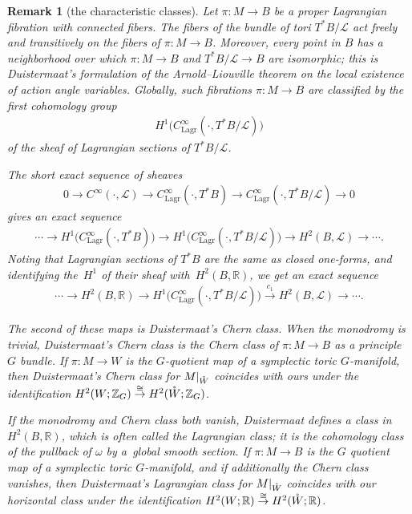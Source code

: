 \documentclass[pdftex]{sigma}
\numberwithin{equation}{section}
\newtheorem{Remark}[Lemma]{Remark}
\begin{document}
\begin{Remark}[the characteristic classes] \label{rmrk:1.9}
Let $\pi \colon M \to B$ be a proper Lagrangian f\/ibration with connected f\/ibers.
The f\/ibers of the bundle of tori $T^*B/{\mathcal L}$ act freely and transitively
on the f\/ibers of $\pi \colon M \to B$.
Moreover, every point in $B$ has a neighborhood over which
$\pi \colon M \to B$ and $T^*B/{\mathcal L} \to B$ are isomorphic;
this is Duistermaat's formulation of the Arnold--Liouville theorem
on the local existence of action angle variables.
Globally, such f\/ibrations $\pi \colon M \to B$
are classif\/ied by the f\/irst cohomology group
\begin{gather*}
 H^1 \big( C^{\infty}_{\text{Lagr}} (\cdot,T^*B/{\mathcal L}) \big)
 \end{gather*}
of the sheaf of Lagrangian sections of $T^*B/{\mathcal L}$.

The short exact sequence of sheaves
\begin{gather*}
 0 \to C^{\infty}(\cdot,{\mathcal L}) \to C^{\infty}_{\text{Lagr}} (\cdot,T^*B)
  \to C^{\infty}_{\text{Lagr}}(\cdot,T^*B/{\mathcal L}) \to 0
\end{gather*}
gives an exact sequence
\begin{gather*}
 \cdots \to
   H^1\big(C^{\infty}_{\text{Lagr}}(\cdot,T^*B)\big) \to H^1\big(C^{\infty}_{\text{Lagr}}(\cdot,T^*B/{\mathcal L})\big)
   \to H^2(B,{\mathcal L}) \to \cdots .
\end{gather*}
Noting that Lagrangian sections of $T^*B$ are the same as closed one-forms,
and identifying the~$H^1$ of their sheaf with~$H^2(B,{\mathbb R})$,
we get an exact sequence
\begin{gather} \label{exact Duis}
 \cdots \to
 H^2(B,{\mathbb R}) \to H^1\big(C^{\infty}_{\text{Lagr}}(\cdot,T^*B/{\mathcal L})\big) \stackrel{c_1}{\to}
 H^2(B,{\mathcal L})
 \to \cdots.
\end{gather}

The second of these maps is Duistermaat's Chern class.  When the monodromy
is trivial, Duistermaat's Chern class is the Chern class
of $\pi \colon M \to B$ as a principle $G$ bundle.
If $\pi \colon M \to W$ is the $G$-quotient map of a symplectic toric
$G$-manifold, then Duistermaat's Chern class for $M|_{{\mathaccent23{W}}}$
coincides with ours under the identif\/ication
$H^2(W;{\mathbb Z}_G) \stackrel{\cong}{\to} H^2({\mathaccent23{W}};{\mathbb Z}_G)$.

If the monodromy and Chern class both vanish, Duistermaat def\/ines a class
in $H^2(B,{\mathbb R})$, which is often called the \textit{Lagrangian class};
it is the cohomology class of the pullback of $\omega$ by a~global smooth
section.  If $\pi \colon M \to B$ is the $G$ quotient map of a symplectic toric
$G$-manifold, and if additionally the Chern class vanishes,
then Duistermaat's Lagrangian class for $M|_{{\mathaccent23{W}}}$ coincides
with our horizontal class under the identif\/ication
$H^2(W;{\mathbb R}) \stackrel{\cong}{\to} H^2({\mathaccent23{W}};{\mathbb R})$.
\end{Remark}
\end{document}

